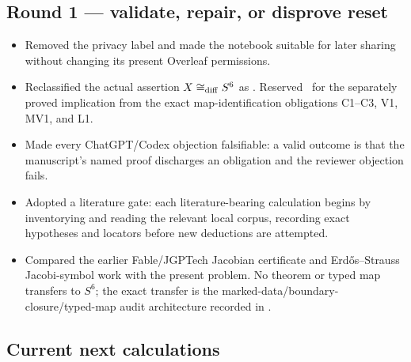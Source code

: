 \subsection*{Round 1 --- validate, repair, or disprove reset}

\begin{itemize}[leftmargin=1.8em]
\item Removed the privacy label and made the notebook suitable for later sharing without changing its present Overleaf permissions.
\item Reclassified the actual assertion $X\cong_{\rm diff}S^6$ as \Open. Reserved \Conditional\ for the separately proved implication from the exact map-identification obligations C1--C3, V1, MV1, and L1.
\item Made every ChatGPT/Codex objection falsifiable: a valid outcome is that the manuscript's named proof discharges an obligation and the reviewer objection fails.
\item Adopted a literature gate: each literature-bearing calculation begins by inventorying and reading the relevant local corpus, recording exact hypotheses and locators before new deductions are attempted.
\item Compared the earlier Fable/JGPTech Jacobian certificate and Erd\H{o}s--Strauss Jacobi-symbol work with the present problem. No theorem or typed map transfers to $S^6$; the exact transfer is the marked-data/boundary-closure/typed-map audit architecture recorded in
.
\end{itemize}

\subsection*{Current next calculations}

